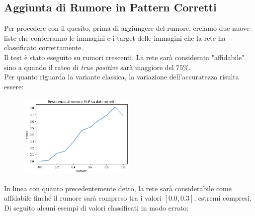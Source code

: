 \documentclass[12pt, a4paper]{article}
\begin{document}
\subsection{Aggiunta di Rumore in Pattern Corretti}
Per procedere con il quesito, prima di aggiungere del rumore, creiamo due nuove liste che conterranno le immagini e i target delle immagini che la rete ha classificato correttamente.\\
Il test è stato eseguito su rumori crescenti. La rete sarà considerata "affidabile" sino a quando il rateo di \textit{true positive} sarà maggiore del \(75\%\).\\
Per quanto riguarda la variante classica, la variazione dell'accuratezza risulta essere:
\begin{figure}[H]
    \centering
    \includegraphics[width=0.50\textwidth]{TPClassica.png}    
\end{figure}
In linea con quanto precedentemente detto, la rete sarà considerabile come affidabile finché il rumore sarà compreso tra i valori \([0.0, 0.3]\), estremi compresi.\\
Di seguito alcuni esempi di valori classificati in modo errato:
\end{document}
